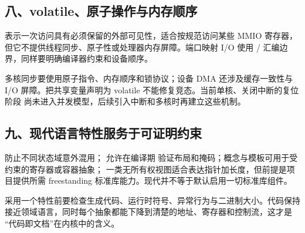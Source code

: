 \subsection{八、volatile、原子操作与内存顺序}

 表示一次访问具有必须保留的外部可见性，适合按规范访问某些
MMIO 寄存器，但它不提供线程同步、原子性或处理器内存屏障。端口映射 I/O 使用
/ 汇编边界，同样要明确编译器约束和设备顺序。

多核同步要使用原子指令、内存顺序和锁协议；设备 DMA 还涉及缓存一致性与 I/O
屏障。把共享变量声明为 volatile 不能修复竞态。当前单核、关闭中断的复位阶段
尚未进入并发模型，后续引入中断和多核时再建立这些机制。

\subsection{九、现代语言特性服务于可证明约束}

 防止不同状态域意外混用； 允许在编译期
验证布局和掩码；概念与模板可用于受约束的寄存器或容器抽象；
 一类无所有权视图适合表达指针加长度，但前提是项目提供所需
freestanding 标准库能力。现代并不等于默认启用一切标准库组件。

采用一个特性前要检查生成代码、运行时符号、异常行为与二进制大小。代码保持
接近领域语言，同时每个抽象都能下降到清楚的地址、寄存器和控制流，这才是
“代码即文档”在内核中的含义。
